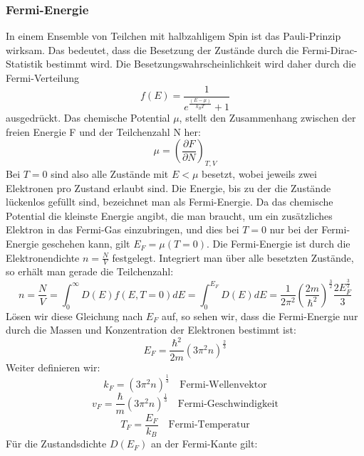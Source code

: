 \documentclass[11pt]{article}
\begin{document}
\subsubsection{Fermi-Energie}
In einem Ensemble von Teilchen mit halbzahligem Spin ist das Pauli-Prinzip
wirksam. Das bedeutet, dass die Besetzung der Zustände durch die Fermi-Dirac-
Statistik bestimmt wird. Die Besetzungswahrscheinlichkeit wird daher durch die
Fermi-Verteilung
\begin{equation}
  f(E)=\frac{1}{e^{\frac{(E-\mu)}{k_BT}}+1}
\end{equation}
ausgedrückt. Das chemische Potential $\mu$, stellt den Zusammenhang zwischen
der freien Energie F und der Teilchenzahl N her:
\begin{equation}
  \mu=\left(\frac{\partial F}{\partial N}\right)_{T,V}
\end{equation}
Bei $T=0$ sind also alle Zustände mit $E<\mu$ besetzt, wobei jeweils zwei
Elektronen pro Zustand erlaubt sind. Die Energie, bis zu der die Zustände
lückenlos gefüllt sind, bezeichnet man als Fermi-Energie. Da das chemische
Potential die kleinste Energie angibt, die man braucht, um ein zusätzliches
Elektron in das Fermi-Gas einzubringen, und dies bei $T=0$ nur bei der Fermi-
Energie geschehen kann, gilt $E_F=\mu(T=0)$. Die Fermi-Energie ist durch die
Elektronendichte $n=\frac{N}{V}$ festgelegt. Integriert man über alle besetzten
Zustände, so erhält man gerade die Teilchenzahl:
\begin{equation}
  n=\frac{N}{V}=\int_0^\infty D(E)f(E,T=0)dE=\int_0^{E_F}D(E)dE=\frac{1}{2\pi^2}
  \left( \frac{2m}{\hbar^2}\right)^{\frac{3}{2}}\frac{2E_F^{\frac{3}{2}}}{3}
\end{equation}
Lösen wir diese Gleichung nach $E_F$ auf, so sehen wir, dass die Fermi-Energie
nur durch die Massen und Konzentration der Elektronen bestimmt ist:
\begin{equation}
  E_F=\frac{\hbar^2}{2m}(3\pi^2n)^{\frac{2}{3}}
\end{equation}
Weiter definieren wir:
\begin{equation}
  k_F=(3\pi^2n)^{\frac{1}{3}}\quad \text{Fermi-Wellenvektor}
\end{equation}
\begin{equation}
  v_F=\frac{\hbar}{m}(3\pi^2n)^{\frac{1}{3}}\quad \text{Fermi-Geschwindigkeit}
\end{equation}
\begin{equation}
  T_F=\frac{E_F}{k_B}\quad \text{Fermi-Temperatur}
\end{equation}
Für die Zustandsdichte $D(E_F)$ an der Fermi-Kante gilt:
\end{document}
